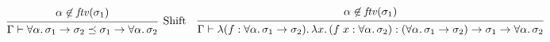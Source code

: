 \documentclass[12pt]{article}
\begin{document}
\pagestyle{empty}

\begin{align*}
    \def\arraystretch{5}
    \begin{array}{cc}
        \begin{prooftree}
            \hypo{\alpha \not\in \mathit{ftv}(\sigma_1)}
            \infer1[Shift]{\Gamma \vdash \forall \alpha\ldotp \sigma_1 \to \sigma_2 \preceq \sigma_1 \to \forall \alpha\ldotp \sigma_2}
        \end{prooftree}
        &
        \begin{prooftree}
            \hypo{\alpha \not\in \mathit{ftv}(\sigma_1)}
            \infer1{\Gamma \vdash \lambda (f: \forall \alpha\ldotp \sigma_1 \to \sigma_2)\ldotp \lambda x\ldotp (f\; x: \forall \alpha\ldotp \sigma_2): (\forall \alpha\ldotp \sigma_1 \to \sigma_2) \to \sigma_1 \to \forall \alpha\ldotp \sigma_2}
        \end{prooftree}
    \end{array}
\end{align*}
\end{document}
